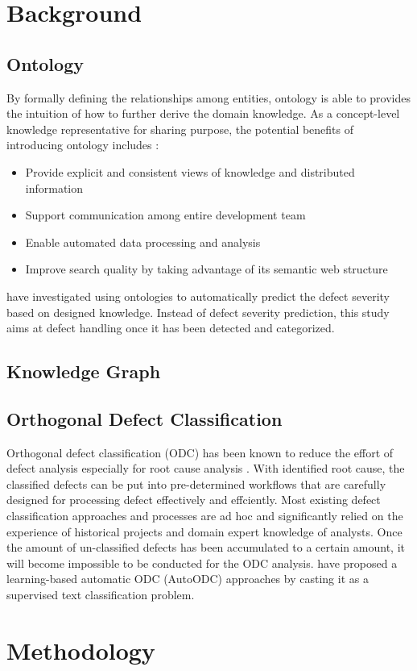 \documentclass[12pt] {article}
\begin{document}
\section{Background}
\subsection{Ontology}
By formally defining the relationships among entities, ontology is able to provides the intuition of how to further derive the domain knowledge.
As a concept-level knowledge representative for sharing purpose, the potential benefits of introducing ontology includes \cite{christina2016an}:
\begin{itemize}
    \item Provide explicit and consistent views of knowledge and distributed information
    \item Support communication among entire development team 
    \item Enable automated data processing and analysis
    \item Improve search quality by taking advantage of its semantic web structure
\end{itemize}
 have investigated using ontologies to automatically predict the defect severity based on designed knowledge.
Instead of defect severity prediction, this study aims at defect handling once it has been detected and categorized.

\subsection{Knowledge Graph}
\subsection{Orthogonal Defect Classification}
Orthogonal defect classification (ODC) has been known to reduce the effort of defect analysis especially for root cause analysis \cite{buglione2006introducing}.
With identified root cause, the classified defects can be put into pre-determined workflows that are carefully designed for processing defect effectively and effciently. 
Most existing defect classification approaches and processes are ad hoc and significantly relied on the experience of historical projects and domain expert knowledge of analysts. 
Once the amount of un-classified defects has been accumulated to a certain amount, it will become impossible to be conducted for the ODC analysis.
 have proposed a learning-based automatic ODC (AutoODC) approaches by casting it as a supervised text classification problem.

\section{Methodology}

\pagebreak
\end{document}
